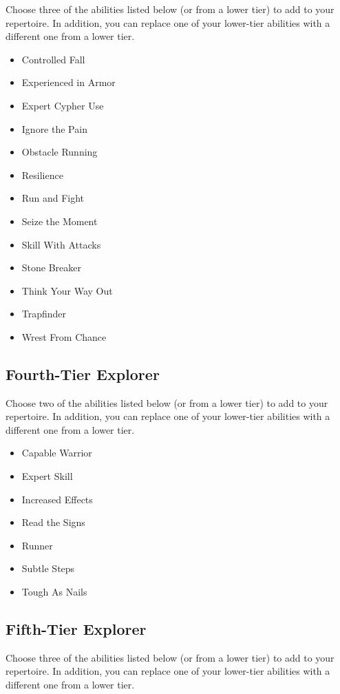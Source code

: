 \begin{multicols}{2}
Choose three of the abilities listed below (or from a lower tier) to add to your repertoire. In addition, you can replace one of your lower-tier abilities with a different one from a lower tier.

\begin{itemize}
\item Controlled Fall
\item Experienced in Armor
\item Expert Cypher Use
\item Ignore the Pain
\item Obstacle Running
\item Resilience
\item Run and Fight
\item Seize the Moment
\item Skill With Attacks
\item Stone Breaker
\item Think Your Way Out
\item Trapfinder
\item Wrest From Chance
\end{itemize}

\subsection{Fourth-Tier Explorer}

Choose two of the abilities listed below (or from a lower tier) to add to your repertoire. In addition, you can replace one of your lower-tier abilities with a different one from a lower tier.

\begin{itemize}
\item Capable Warrior
\item Expert Skill
\item Increased Effects
\item Read the Signs
\item Runner
\item Subtle Steps
\item Tough As Nails
\end{itemize}

\subsection{Fifth-Tier Explorer}

Choose three of the abilities listed below (or from a lower tier) to add to your repertoire. In addition, you can replace one of your lower-tier abilities with a different one from a lower tier.


\end{multicols}
